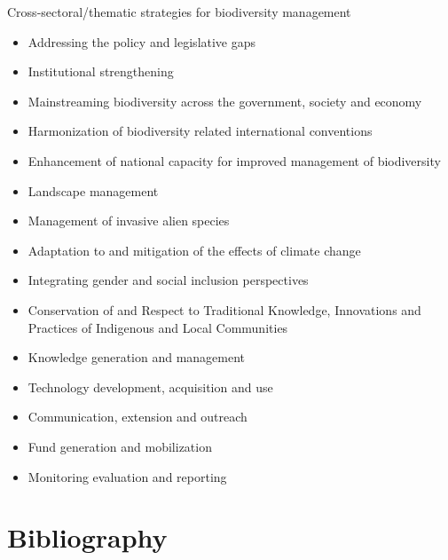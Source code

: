 \documentclass[
  ignorenonframetext,
  aspectratio=169]{beamer}
\providecommand{\tightlist}{%
  \setlength{\itemsep}{0pt}\setlength{\parskip}{0pt}}
\begin{document}
\begin{frame}{Cross-sectoral/thematic strategies for biodiversity
management}
\protect\hypertarget{cross-sectoralthematic-strategies-for-biodiversity-management}{}
\footnotesize

\begin{itemize}
\tightlist
\item
  Addressing the policy and legislative gaps
\item
  Institutional strengthening
\item
  Mainstreaming biodiversity across the government, society and economy
\item
  Harmonization of biodiversity related international conventions
\item
  Enhancement of national capacity for improved management of
  biodiversity
\item
  Landscape management
\item
  Management of invasive alien species
\item
  Adaptation to and mitigation of the effects of climate change
\item
  Integrating gender and social inclusion perspectives
\item
  Conservation of and Respect to Traditional Knowledge, Innovations and
  Practices of Indigenous and Local Communities
\item
  Knowledge generation and management
\item
  Technology development, acquisition and use
\item
  Communication, extension and outreach
\item
  Fund generation and mobilization
\item
  Monitoring evaluation and reporting
\end{itemize}
\end{frame}

\hypertarget{bibliography}{%
\section*{Bibliography}\label{bibliography}}
\end{document}
